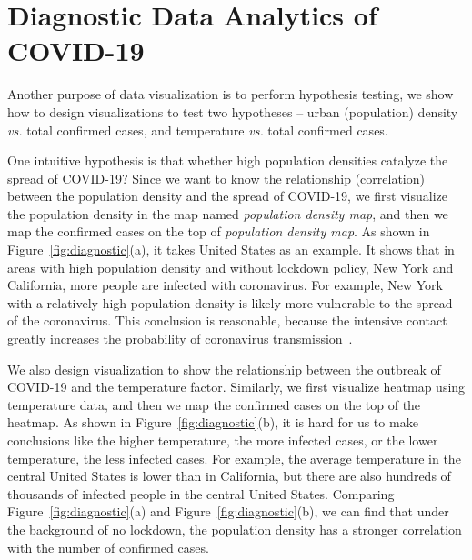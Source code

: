 \section{Diagnostic Data Analytics of COVID-19}
\label{sec:diagnostic}
Another purpose of data visualization is to perform hypothesis testing, we show how to design visualizations to test two hypotheses -- urban (population) density \textit{vs.} total confirmed cases, and temperature \textit{vs.} total confirmed cases.

One intuitive hypothesis is that whether high population densities catalyze the spread of COVID-19? 
Since we want to know the relationship (correlation) between the population density and the spread of COVID-19, we first visualize the population density in the map named \textit{population density map}, and then we map the confirmed cases on the top of \textit{population density map}. 
As shown in Figure~\ref{fig:diagnostic}(a), it takes United States as an example. It shows that in areas with high population density and without lockdown policy, \eg New York and California, more people are infected with coronavirus.
For example,  New York with a relatively high population density is likely more vulnerable to the spread of the coronavirus. 
This conclusion is reasonable, because the intensive contact greatly increases the probability of coronavirus transmission~\cite{rocklov2020high}.

We also design visualization to show the relationship between the outbreak of COVID-19 and the temperature factor.  Similarly, we first visualize heatmap using temperature data, and then we map the confirmed cases on the top of the heatmap.
As shown in Figure~\ref{fig:diagnostic}(b), it is hard for us to make conclusions like the higher temperature, the more infected cases, or the lower temperature, the less infected cases. 
For example, the average temperature in the central United States is lower than in California, but there are also hundreds of thousands of infected people in the central United States. Comparing Figure~\ref{fig:diagnostic}(a) and Figure~\ref{fig:diagnostic}(b), we can find that under the background of no lockdown, the population density has a stronger correlation with the number of confirmed cases.
